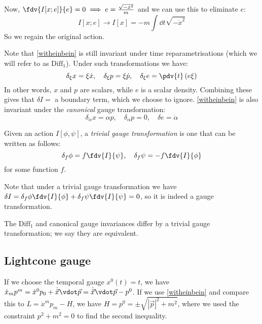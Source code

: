 \documentclass{jknotes}
\begin{document}
Now, \(\fdv{I[x;e]}{e} = 0 \implies e = \frac{\sqrt{-\dot{x}^2}}{m}\) and we can use this to eliminate \(e\):
\begin{equation}
    I[x;e] \rightarrow I[x] = -m\int\dd{t}\sqrt{-\dot{x}^2}
\end{equation}
So we regain the original action.

Note that \eqref{witheinbein} is still invariant under time reparametrisations (which we will refer to as \(\text{Diff}_1\)). Under such transformations we have:
\begin{equation}
    \delta_\xi x = \xi \dot{x},\quad \delta_\xi p = \xi \dot{p},\quad \delta_\xi e = \pdv{t}\left( e\xi \right)
\end{equation}
In other words, \(x\) and \(p\) are scalars, while \(e\) is a scalar density. Combining these gives that \(\delta I = \) a boundary term, which we choose to ignore. \eqref{witheinbein} is also invariant under the \emph{canonical} gauge transformation:
\begin{equation}
    \delta_\alpha x = \alpha p,\quad \delta_\alpha p = 0, \quad \delta e = \dot{\alpha}
\end{equation}

\begin{defn}
    Given an action \(I[\phi,\psi]\), a \emph{trivial gauge transformation} is one that can be written as follows:
    \begin{equation}
        \delta_f\phi = f \fdv{I}{\psi},\quad \delta_f\psi = -f \fdv{I}{\phi}
    \end{equation}
    for some function \(f\).
\end{defn}
Note that under a trivial gauge transformation we have \(\delta I = \delta_f\phi \fdv{I}{\phi} + \delta_f\psi\fdv{I}{\psi} = 0\), so it is indeed a gauge transformation.

The \(\text{Diff}_1\) and canonical gauge invariances differ by a trivial gauge transformation; we say they are equivalent.

\subsection{Lightcone gauge}

If we choose the temporal gauge \(x^0(t)=t\), we have \(\dot{x}_mp^m=\dot{x}^0p_0 + \dot{\vec{x}}\vdot\vec{p} = \dot{\vec{x}}\vdot\vec{p}-p^0\). If we use \eqref{witheinbein} and compare this to \(L = \dot{x}^mp_m - H\), we have \(H = p^0 = \pm\sqrt{|\vec{p}|^2+m^2}\), where we used the constraint \(p^2+m^2=0\) to find the second inequality.
\end{document}
